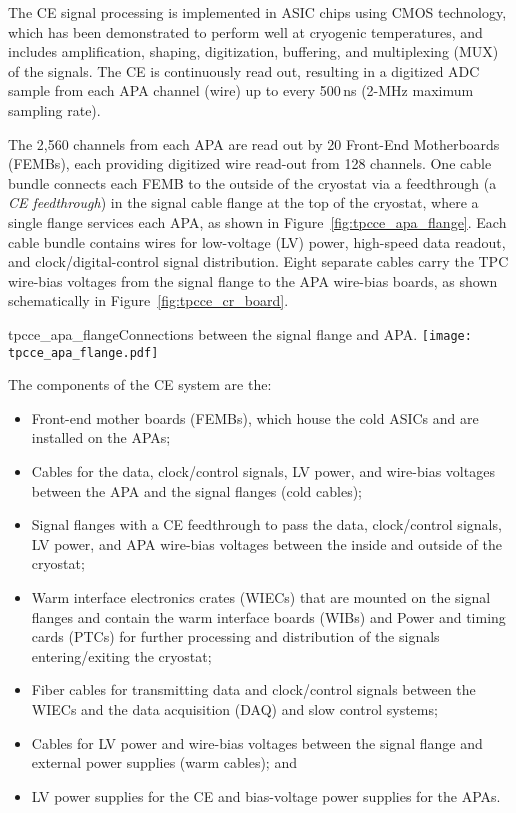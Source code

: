 
The CE signal processing is implemented in ASIC chips using CMOS technology,
which has been demonstrated to perform well at cryogenic temperatures,
and includes amplification, shaping, digitization, buffering, and multiplexing (MUX) of the signals.
The CE is continuously read out,
resulting in a digitized ADC sample from each APA channel (wire) up to every 500\,ns (2-MHz maximum sampling rate). 

The 2,560 channels from each APA are read out by 20 Front-End Motherboards (FEMBs), each providing 
digitized wire read-out from 128 channels. One cable bundle 
connects each FEMB to the outside of the cryostat via a feedthrough (a \textit{CE feedthrough}) in the signal cable flange at the top of the cryostat, where a single flange services each APA, as shown in Figure~\ref{fig:tpcce_apa_flange}. 
Each cable bundle contains wires for low-voltage (LV) power, high-speed data readout,
and clock/digital-control signal distribution.
Eight separate cables carry the TPC wire-bias voltages from the signal flange to the APA wire-bias boards, as
shown schematically in Figure~\ref{fig:tpcce_cr_board}.

\begin{cdrfigure}{tpcce_apa_flange}{Connections between
the signal flange and APA.}
\texttt{[image: tpcce\_apa\_flange.pdf]}
\end{cdrfigure}

The components of the CE system are the:
\begin{itemize}
\item Front-end mother boards (FEMBs), which house the cold ASICs and are installed on the APAs;
\item Cables for the data, clock/control signals, LV power, and wire-bias voltages 
between the APA and the signal flanges (cold cables);
\item Signal flanges with a CE feedthrough to pass the data, clock/control signals, 
LV power, and APA wire-bias voltages between the inside and outside of the cryostat;
\item Warm interface electronics crates (WIECs) that are mounted on the signal flanges and contain the warm interface boards (WIBs)
and Power and timing cards (PTCs) for further processing and distribution of the signals entering/exiting the cryostat;
\item Fiber cables for transmitting data and clock/control signals between the WIECs and the data acquisition 
(DAQ) and slow control systems;
\item Cables for LV power and wire-bias voltages between the signal flange and external power supplies (warm cables); and
\item LV power supplies for the CE and bias-voltage power supplies for the APAs.
\end{itemize}

